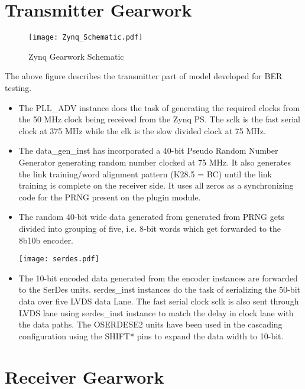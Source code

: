 \documentclass[11pt,oneside,fleqn]{book} %
\begin{document}
\section{Transmitter Gearwork}
\begin{figure}[h!]
\centering\texttt{[image: Zynq\_Schematic.pdf]}
\caption{Zynq Gearwork Schematic}
\end{figure}
The above figure describes the transmitter part of model developed for BER testing.
\begin{itemize}
    \item The PLL\_ADV instance does the task of generating  the required clocks from the 50 MHz clock being received from the Zynq PS. The sclk is the fast serial clock at 375 MHz while the clk is the slow divided clock at 75 MHz. 
    \item The data\_gen\_inst has incorporated a 40-bit Pseudo Random Number Generator generating random number clocked at 75 MHz. It also generates the link training/word alignment pattern (K28.5 = BC) until the link training is complete on the receiver side. It uses all zeros as a synchronizing code for the PRNG present on the plugin module. 
    \item The random 40-bit wide data generated from generated from PRNG gets divided into grouping of five, i.e. 8-bit words which get forwarded to the 8b10b encoder. \par
        \begin{minipage}{\linewidth}
        \centering\texttt{[image: serdes.pdf]}
    \end{minipage}
    \item The 10-bit encoded data generated from the encoder instances are forwarded to the SerDes units. serdes\_inst instances do the task of serializing the 50-bit data over five LVDS data Lane. The fast serial clock sclk is also sent through LVDS lane using serdes\_inst instance to match the delay in clock lane with the data paths. The OSERDESE2 units have been used in the cascading configuration using the SHIFT* pins to expand the data width to 10-bit. 

    
\end{itemize} 
\section{Receiver Gearwork}
\end{document}
